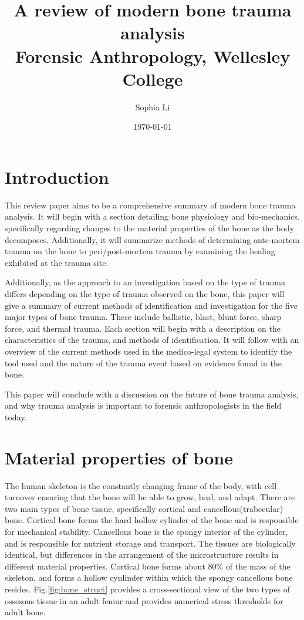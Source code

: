 \documentclass[titlepage]{article}
\title{A review of modern bone trauma analysis\\ \large Forensic Anthropology, Wellesley College}
\author{Sophia Li}
\date{\today \\ \vspace{5em}}
\begin{document}
\maketitle


\section{Introduction}
This review paper aims to be a comprehensive summary of modern bone trauma analysis. It will begin with a section detailing bone physiology and bio-mechanics, specifically regarding changes to the material properties of the bone as the body decomposes. Additionally, it will summarize methods of determining ante-mortem trauma on the bone to peri/post-mortem trauma by examining the healing exhibited at the trauma site.

Additionally, as the approach to an investigation based on the type of trauma differs depending on the type of trauma observed on the bone, this paper will give a summary of current methods of identification and investigation for the five major types of bone trauma. These include ballistic, blast, blunt force, sharp force, and thermal trauma. Each section will begin with a description on the characteristics of the trauma, and methods of identification. It will follow with an overview of the current methods used in the medico-legal system to identify the tool used and the nature of the trauma event based on evidence found in the bone.

This paper will conclude with a discussion on the future of bone trauma analysis, and why trauma analysis is important to forensic anthropologists in the field today.

\section{Material properties of bone}
The human skeleton is the constantly changing frame of the body, with cell turnover ensuring that the bone will be able to grow, heal, and adapt. There are two main types of bone tissue, specifically cortical and cancellous(trabecular) bone. Cortical bone forms the hard hollow cylinder of the bone and is responsible for mechanical stability. Cancellous bone is the spongy interior of the cylinder, and is responsible for nutrient storage and transport. The tissues are biologically identical, but differences in the arrangement of the microstructure results in different material properties. Cortical bone forms about 80\% of the mass of the skeleton, and forms a hollow cynlinder within which the spongy cancellous bone resides.\cite{bone} Fig.\ref{fig:bone_struct} provides a cross-sectional view of the two types of ossesous tissue in an adult femur and provides numerical stress thresholds for adult bone.\\
\end{document}
